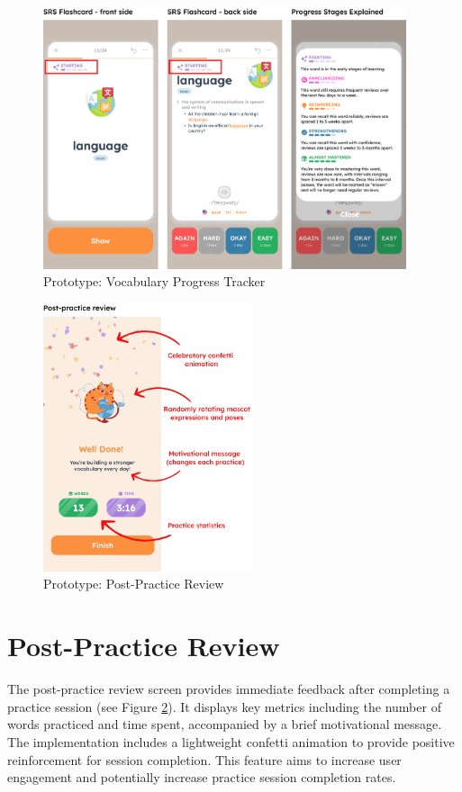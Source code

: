 \begin{figure}[!h]
    \includegraphics[width=0.95\textwidth]{src/figures/em-prototype-progress-system.png}
    \caption{Prototype: Vocabulary Progress Tracker}
    \label{fig:em-prototype-word-progress}
\end{figure}
\begin{figure}[!h]
    \includegraphics[width=0.55\textwidth]{src/figures/em-prototype-review.png}
    \caption{Prototype: Post-Practice Review}
    \label{fig:em-prototype-practice-review}
\end{figure}

\section{Post-Practice Review}

The post-practice review screen provides immediate feedback after completing a practice session (see Figure \ref{fig:em-prototype-practice-review}). It displays key metrics including the number of words practiced and time spent, accompanied by a brief motivational message. The implementation includes a lightweight confetti animation to provide positive reinforcement for session completion. This feature aims to increase user engagement and potentially increase practice session completion rates.

